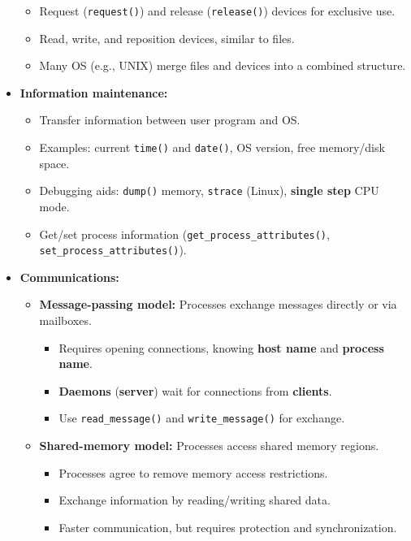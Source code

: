 \begin{itemize}
    \begin{itemize}
        \item Request (\texttt{request()}) and release (\texttt{release()}) devices for exclusive use.
        \item Read, write, and reposition devices, similar to files.
        \item Many OS (e.g., UNIX) merge files and devices into a combined structure.
    \end{itemize}
    \item \textbf{Information maintenance:}
    \begin{itemize}
        \item Transfer information between user program and OS.
        \item Examples: current \texttt{time()} and \texttt{date()}, OS version, free memory/disk space.
        \item Debugging aids: \texttt{dump()} memory, \texttt{strace} (Linux), \textbf{single step} CPU mode.
        \item Get/set process information (\texttt{get\_process\_attributes()}, \texttt{set\_process\_attributes()}).
    \end{itemize}
    \item \textbf{Communications:}
    \begin{itemize}
        \item \textbf{Message-passing model:} Processes exchange messages directly or via mailboxes.
        \begin{itemize}
            \item Requires opening connections, knowing \textbf{host name} and \textbf{process name}.
            \item \textbf{Daemons} (\textbf{server}) wait for connections from \textbf{clients}.
            \item Use \texttt{read\_message()} and \texttt{write\_message()} for exchange.
        \end{itemize}
        \item \textbf{Shared-memory model:} Processes access shared memory regions.
        \begin{itemize}
            \item Processes agree to remove memory access restrictions.
            \item Exchange information by reading/writing shared data.
            \item Faster communication, but requires protection and synchronization.

\end{itemize}
\end{itemize}
\end{itemize}
